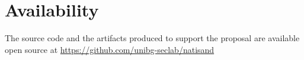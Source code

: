 
       










\section*{Availability}
The source code and the artifacts produced to support the proposal are
available open source at \url{https://github.com/unibg-seclab/natisand}

